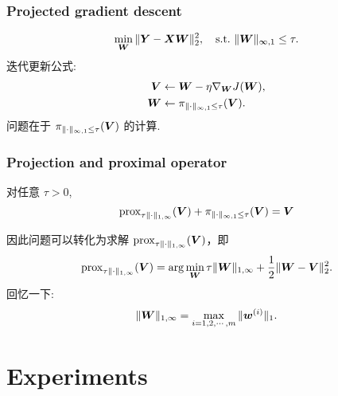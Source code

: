 \documentclass{beamer}
\begin{document}
\begin{frame}[fragile]
    \frametitle{Projected gradient descent}
    \begin{align}
        \min_{{\bm W}}\|{\bm Y}-{\bm X}{\bm W}\|_2^2,\quad\mathrm{s.t.}~\|{\bm W}\|_{\infty,1}\leq\tau.
    \end{align}
    迭代更新公式:
    \begin{align}
        {\bm V}&\leftarrow{\bm W}-\eta\nabla_{{\bm W}}J({\bm W}),\\
        {\bm W}&\leftarrow\pi_{\|\cdot\|_{\infty,1}\leq\tau}({\bm V}).
    \end{align}
    问题在于 $\pi_{\|\cdot\|_{\infty,1}\leq\tau}({\bm V})$ 的计算.
\end{frame}

\begin{frame}[fragile]
    \frametitle{Projection and proximal operator}
    \begin{lemma}
        对任意 $\tau>0$,
        \begin{equation}
            \mathrm{prox}_{\tau\|\cdot\|_{1,\infty}}({\bm V})+\pi_{\|\cdot\|_{\infty,1}\leq\tau}({\bm V})={\bm V}
        \end{equation}
    \end{lemma}
    因此问题可以转化为求解 $\mathrm{prox}_{\tau\|\cdot\|_{1,\infty}}({\bm V})$，即
    \begin{equation}
        \mathrm{prox}_{\tau\|\cdot\|_{1,\infty}}({\bm V})=\arg\min_{{\bm W}}\tau\|{\bm W}\|_{1,\infty}+\frac12\|{\bm W}-{\bm V}\|_2^2.
    \end{equation}
    \vspace{8pt}
    回忆一下:
    \begin{equation}
        \|{\bm W}\|_{1,\infty}=\max_{i=1,2,\cdots,m}\|{\bm w}^{(i)}\|_1.
    \end{equation}
\end{frame}

\section{Experiments}
\end{document}
